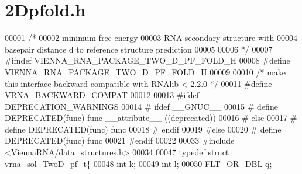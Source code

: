 \hypertarget{2Dpfold_8h_source}{}\section{2\+Dpfold.h}
\label{2Dpfold_8h_source}

\begin{DoxyCode}
00001 \textcolor{comment}{/*}
00002 \textcolor{comment}{      minimum free energy}
00003 \textcolor{comment}{      RNA secondary structure with}
00004 \textcolor{comment}{      basepair distance d to reference structure prediction}
00005 \textcolor{comment}{}
00006 \textcolor{comment}{*/}
00007 \textcolor{preprocessor}{#ifndef VIENNA\_RNA\_PACKAGE\_TWO\_D\_PF\_FOLD\_H}
00008 \textcolor{preprocessor}{#define VIENNA\_RNA\_PACKAGE\_TWO\_D\_PF\_FOLD\_H}
00009 
00010 \textcolor{comment}{/* make this interface backward compatible with RNAlib < 2.2.0 */}
00011 \textcolor{preprocessor}{#define VRNA\_BACKWARD\_COMPAT}
00012 
00013 \textcolor{preprocessor}{#ifdef DEPRECATION\_WARNINGS}
00014 \textcolor{preprocessor}{# ifdef \_\_GNUC\_\_}
00015 \textcolor{preprocessor}{#  define DEPRECATED(func) func \_\_attribute\_\_ ((deprecated))}
00016 \textcolor{preprocessor}{# else}
00017 \textcolor{preprocessor}{#  define DEPRECATED(func) func}
00018 \textcolor{preprocessor}{# endif}
00019 \textcolor{preprocessor}{#else}
00020 \textcolor{preprocessor}{# define DEPRECATED(func) func}
00021 \textcolor{preprocessor}{#endif}
00022 
00033 \textcolor{preprocessor}{#include <\hyperlink{data__structures_8h}{ViennaRNA/data\_structures.h}>}
00034 
\hypertarget{2Dpfold_8h_source_l00047}{}\hyperlink{group__kl__neighborhood__pf}{00047} \textcolor{keyword}{typedef} \textcolor{keyword}{struct }\hyperlink{group__kl__neighborhood__pf_structvrna__sol__TwoD__pf__t}{vrna\_sol\_TwoD\_pf\_t}\{
\hypertarget{2Dpfold_8h_source_l00048}{}\hyperlink{group__kl__neighborhood__pf_ad1f23b46dc4ebd373abdeb0382d87b83}{00048}   \textcolor{keywordtype}{int} \hyperlink{group__kl__neighborhood__pf_ad1f23b46dc4ebd373abdeb0382d87b83}{k};          
\hypertarget{2Dpfold_8h_source_l00049}{}\hyperlink{group__kl__neighborhood__pf_a01133c264eff2c988d144e07803d1b8b}{00049}   \textcolor{keywordtype}{int} \hyperlink{group__kl__neighborhood__pf_a01133c264eff2c988d144e07803d1b8b}{l};          
\hypertarget{2Dpfold_8h_source_l00050}{}\hyperlink{group__kl__neighborhood__pf_a17ebbf425b8769ded74b5c7b85e58ee1}{00050}   \hyperlink{group__data__structures_ga31125aeace516926bf7f251f759b6126}{FLT\_OR\_DBL}  \hyperlink{group__kl__neighborhood__pf_a17ebbf425b8769ded74b5c7b85e58ee1}{q};  

\end{DoxyCode}
